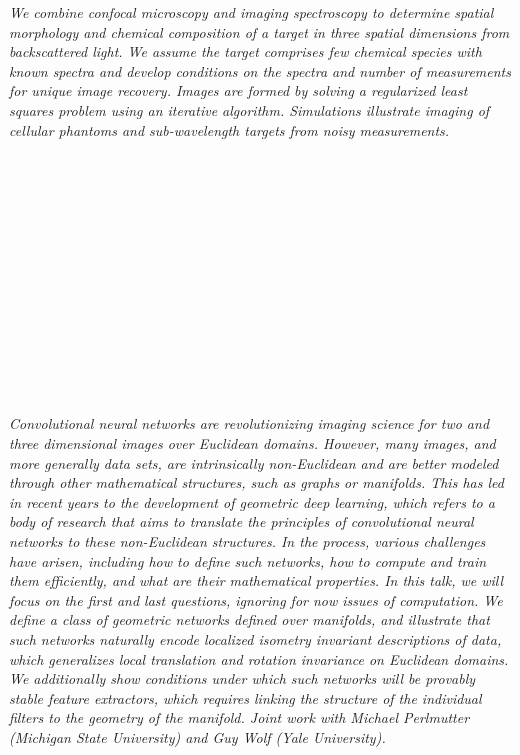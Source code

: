 \begin{multicols}{2}
\\ 
        \\
        \\\\
\\
      \textit{We combine confocal microscopy and imaging spectroscopy to determine spatial morphology and chemical composition of a target in three spatial dimensions from backscattered light. We assume the target comprises few chemical species with known spectra and develop conditions on the spectra and number of measurements for unique image recovery. Images are formed by solving a regularized least squares problem using an iterative algorithm. Simulations illustrate imaging of cellular phantoms and sub-wavelength  targets from noisy measurements.}\\
\\ 
        \\
        \\\\
        \\
        \\\\
        \\
        \\\\
        \\
        \\\\
\\
      \textit{Convolutional neural networks are revolutionizing imaging science for two and three dimensional images over Euclidean domains. However, many images, and more generally data sets, are intrinsically non-Euclidean and are better modeled through other mathematical structures, such as graphs or manifolds. This has led in recent years to the development of geometric deep learning, which refers to a body of research that aims to translate the principles of convolutional neural networks to these non-Euclidean structures. In the process, various challenges have arisen, including how to define such networks, how to compute and train them efficiently, and what are their mathematical properties. In this talk, we will focus on the first and last questions, ignoring for now issues of computation. We define a class of geometric networks defined over manifolds, and illustrate that such networks naturally encode localized isometry invariant descriptions of data, which generalizes local translation and rotation invariance on Euclidean domains. We additionally show conditions under which such networks will be provably stable feature extractors, which requires linking the structure of the individual filters to the geometry of the manifold. Joint work with Michael Perlmutter (Michigan State University) and Guy Wolf (Yale University).}\\

\end{multicols}
